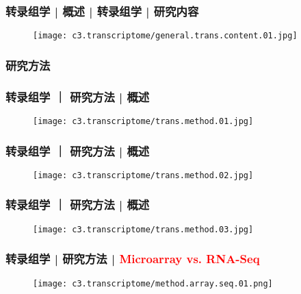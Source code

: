 \begin{frame}
  \frametitle{转录组学 | 概述 | 转录组学 | 研究内容}
  \begin{figure}
    \centering
    \texttt{[image: c3.transcriptome/general.trans.content.01.jpg]}
  \end{figure}
\end{frame}

\subsubsection{研究方法}
\begin{frame}
  \frametitle{转录组学 ｜ 研究方法 | 概述}
  \begin{figure}
    \centering
    \texttt{[image: c3.transcriptome/trans.method.01.jpg]}
  \end{figure}
\end{frame}

\begin{frame}
  \frametitle{转录组学 ｜ 研究方法 | 概述}
  \begin{figure}
    \centering
    \texttt{[image: c3.transcriptome/trans.method.02.jpg]}
  \end{figure}
\end{frame}

\begin{frame}
  \frametitle{转录组学 ｜ 研究方法 | 概述}
  \begin{figure}
    \centering
    \texttt{[image: c3.transcriptome/trans.method.03.jpg]}
  \end{figure}
\end{frame}

\begin{frame}
  \frametitle{转录组学 | 研究方法 | \textcolor{red}{Microarray vs. RNA-Seq}}
  \begin{figure}
    \centering
    \texttt{[image: c3.transcriptome/method.array.seq.01.png]}
  \end{figure}
\end{frame}

